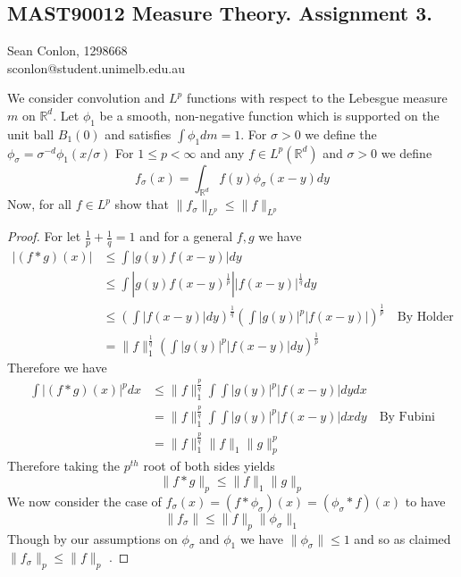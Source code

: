 \documentclass[nocolor]{report}
\begin{document}
    \newpage
    \subsection*{\centering MAST90012 Measure Theory. Assignment 3.}
\begin{center}
    Sean Conlon, 1298668 \\
    sconlon@student.unimelb.edu.au
\end{center}


\begin{ex}[Question 1a] We consider convolution and $L^p$ functions with respect to the Lebesgue measure $m$ on $\mathbb{R}^d$. Let $\phi_1$ be a smooth, non-negative function which is supported on the unit ball $B_1(0)$ and satisfies $\int \phi_1 dm = 1$. For $\sigma>0$ we define the $\phi_\sigma = \sigma^{-d} \phi_1(x/\sigma)$ For $1\leq p <\infty$ and any $f\in L^p(\mathbb{R}^d)$ and $\sigma > 0$ we define
$$f_\sigma (x) = \int_{\mathbb{R}^d} f(y)\phi_\sigma(x-y)dy$$
Now, for all $f\in L^p$ show that $\|f_\sigma\|_{L^p}\leq\|f\|_{L^p}$
\end{ex}
\begin{proof}
    For let $\frac{1}{p} + \frac{1}{q}=1$ and for a general $f,g$ we have 
    \begin{align*}
        |(f*g)(x)| &\leq \int |g(y)f(x-y)|dy \\
                   &\leq \int |g(y)f(x-y)^{\frac{1}{p}}||f(x-y)|^{\frac{1}{q}}dy \\
                   &\leq \left(\int|f(x-y)|dy\right)^{\frac{1}{q}} \left(\int|g(y)|^p |f(x-y)|\right)^{\frac{1}{p}} \quad \text{By Holder} \\
                   &= \|f\|_1^{\frac{1}{q}}  \left(\int|g(y)|^p |f(x-y)|dy\right)^{\frac{1}{p}} 
    \end{align*}        
    Therefore we have 
    \begin{align*}
         \int |(f*g)(x)|^p dx &\leq \|f\|_1^{\frac{p}{q}}  \int \int|g(y)|^p |f(x-y)|dydx \\
         &= \|f\|_1^{\frac{p}{q}}  \int \int|g(y)|^p |f(x-y)|dx dy \quad \text{By Fubini} \\
         &= \|f\|_1^{\frac{p}{q}} \|f\|_1 \|g\|_p^p
    \end{align*}
    Therefore taking the $p^{th}$ root of both sides yields
    $$\|f * g\|_p \leq \|f\|_1 \|g\|_p$$
    We now consider the case of $f_\sigma(x) = (f*\phi_\sigma)(x) = (\phi_\sigma * f)(x)$ to have 
    $$\|f_\sigma\| \leq \|f\|_p \|\phi_\sigma\|_1$$
    Though by our assumptions on $\phi_\sigma$ and $\phi_1$ we have $\|\phi_\sigma\|\leq1 $ and so as claimed $\|f_\sigma\|_p\leq \|f\|_p$ .
\end{proof}
\end{document}
